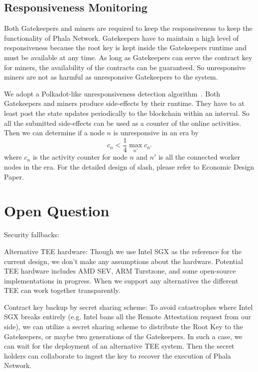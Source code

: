 \subsection{Responsiveness Monitoring}

Both Gatekeepers and miners are required to keep the responsiveness to keep the functionality of Phala Network. Gatekeepers have to maintain a high level of responsiveness because the root key is kept inside the Gatekeepers runtime and must be available at any time. As long as Gatekeepers can serve the contract key for miners, the availability of the contracts can be guaranteed. So unresponsive miners are not as harmful as unresponsive Gatekeepers to the system.

We adopt a Polkadot-like unresponsiveness detection algorithm~\cite{polkadotslashing}. Both Gatekeepers and miners produce side-effects by their runtime. They have to at least post the state updates periodically to the blockchain within an interval. So all the submitted side-effects can be used as a counter of the online activities. Then we can determine if a node $n$ is unresponsive in an era by
$$
    c_n < \frac{1}{4} \max\limits_{n'}{c_{n'}}
$$
where $c_n$ is the activity counter for node $n$ and $n'$ is all the connected worker nodes in the era. For the detailed design of slash, please refer to Economic Design Paper.


\section{Open Question}

Security fallbacks:

\begin{icompact}
    \item Alternative TEE hardware: Though we use Intel SGX as the reference for the current design, we don't make any assumptions about the hardware. Potential TEE hardware includes AMD SEV, ARM Turstzone, and some open-source implementations in progress. When we support any alternatives the different TEE can work together transparently.
    \item Contract key backup by secret sharing scheme: To avoid catastrophes where Intel SGX breaks entirely (e.g. Intel bans all the Remote Attestation request from our side), we can utilize a secret sharing scheme to distribute the Root Key to the Gatekeepers, or maybe two generations of the Gatekeepers. In such a case, we can wait for the deployment of an alternative TEE system. Then the secret holders can collaborate to ingest the key to recover the execution of Phala Network.
\end{icompact}

